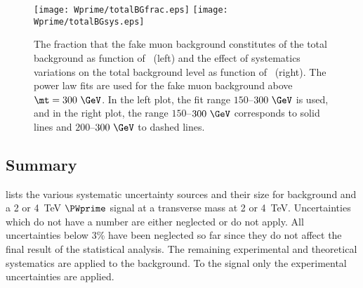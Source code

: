 \begin{figure}[!htb]
  \centering
  \texttt{[image: Wprime/totalBGfrac.eps]}
  \texttt{[image: Wprime/totalBGsys.eps]}
  \caption{The fraction that the fake muon background constitutes of the total background
as function of \mt\ (left) and the effect of systematics variations on the total background
level as function of \mt\ (right). The power law fits are used for the fake muon background above
$\mt=300~\GeV$. In the left plot, the fit range $150$--$300~\GeV$ is used, and in the right plot, the
range $150$--$300~\GeV$ corresponds to solid lines and $200$--$300~\GeV$ to dashed lines.}
  \label{fig:muMMfinal}
\end{figure}

\subsection{Summary}
 lists the various systematic uncertainty sources
and their size for background and a 2 or 4~TeV $\PWprime$ signal at a transverse mass at 2 or 4~TeV.
Uncertainties which do not have a number are either neglected or do not apply. 
All uncertainties below $3$\% have been neglected so far
since they do not affect the final result of the statistical analysis. 
The remaining experimental and theoretical systematics are applied to the background.
To the signal only the experimental uncertainties are applied. 

